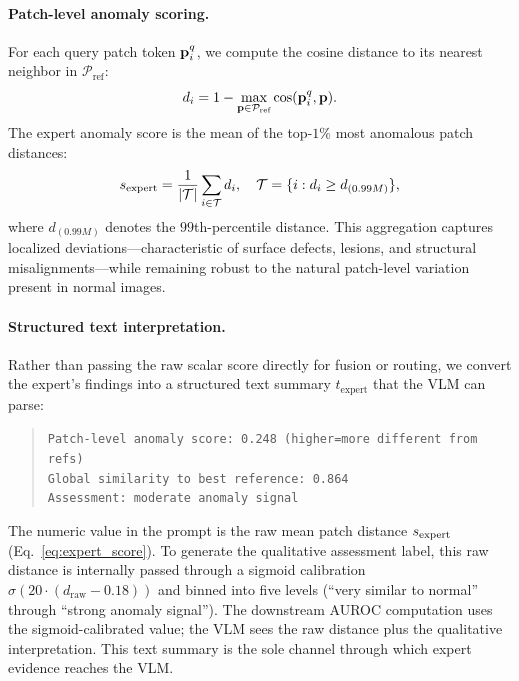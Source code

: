 \paragraph{Patch-level anomaly scoring.}
For each query patch token $\mathbf{p}^q_i$, we compute the cosine distance to its nearest neighbor in $\mathcal{P}_{\text{ref}}$:
\begin{equation}
    d_i = 1 - \max_{\mathbf{p} \in \mathcal{P}_{\text{ref}}} \cos(\mathbf{p}^q_i, \mathbf{p}).
    \label{eq:patch_distance}
\end{equation}
The expert anomaly score is the mean of the top-$1\%$ most anomalous patch distances:
\begin{equation}
    s_{\text{expert}} = \frac{1}{|\mathcal{T}|} \sum_{i \in \mathcal{T}} d_i, \quad \mathcal{T} = \{i : d_i \geq d_{(0.99M)}\},
    \label{eq:expert_score}
\end{equation}
where $d_{(0.99M)}$ denotes the $99$th-percentile distance.
This aggregation captures localized deviations---characteristic of surface defects, lesions, and structural misalignments---while remaining robust to the natural patch-level variation present in normal images.

\paragraph{Structured text interpretation.}
Rather than passing the raw scalar score directly for fusion or routing, we convert the expert's findings into a structured text summary $t_{\text{expert}}$ that the VLM can parse:
\begin{quote}
\small
\texttt{Patch-level anomaly score: 0.248 (higher=more different from refs)} \\
\texttt{Global similarity to best reference: 0.864} \\
\texttt{Assessment: moderate anomaly signal}
\end{quote}
The numeric value in the prompt is the raw mean patch distance $s_{\text{expert}}$ (Eq.~\ref{eq:expert_score}).
To generate the qualitative assessment label, this raw distance is internally passed through a sigmoid calibration $\sigma(20 \cdot (d_{\text{raw}} - 0.18))$ and binned into five levels (``very similar to normal'' through ``strong anomaly signal'').
The downstream AUROC computation uses the sigmoid-calibrated value; the VLM sees the raw distance plus the qualitative interpretation.
This text summary is the sole channel through which expert evidence reaches the VLM.

